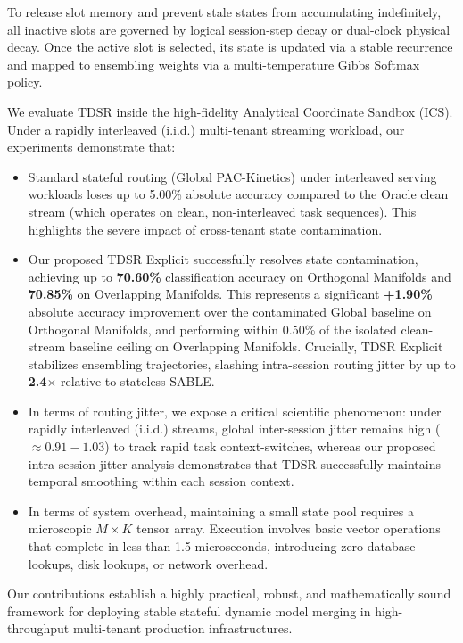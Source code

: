 To release slot memory and prevent stale states from accumulating indefinitely, all inactive slots are governed by logical session-step decay or dual-clock physical decay. Once the active slot is selected, its state is updated via a stable recurrence and mapped to ensembling weights via a multi-temperature Gibbs Softmax policy.

We evaluate TDSR inside the high-fidelity Analytical Coordinate Sandbox (ICS). Under a rapidly interleaved (i.i.d.) multi-tenant streaming workload, our experiments demonstrate that:
\begin{itemize}
    \item Standard stateful routing (Global PAC-Kinetics) under interleaved serving workloads loses up to 5.00\% absolute accuracy compared to the Oracle clean stream (which operates on clean, non-interleaved task sequences). This highlights the severe impact of cross-tenant state contamination.
    \item Our proposed TDSR Explicit successfully resolves state contamination, achieving up to \textbf{70.60\%} classification accuracy on Orthogonal Manifolds and \textbf{70.85\%} on Overlapping Manifolds. This represents a significant \textbf{+1.90\%} absolute accuracy improvement over the contaminated Global baseline on Orthogonal Manifolds, and performing within 0.50\% of the isolated clean-stream baseline ceiling on Overlapping Manifolds. Crucially, TDSR Explicit stabilizes ensembling trajectories, slashing intra-session routing jitter by up to \textbf{2.4$\times$} relative to stateless SABLE.
    \item In terms of routing jitter, we expose a critical scientific phenomenon: under rapidly interleaved (i.i.d.) streams, global inter-session jitter remains high ($\approx 0.91 - 1.03$) to track rapid task context-switches, whereas our proposed intra-session jitter analysis demonstrates that TDSR successfully maintains temporal smoothing within each session context.
    \item In terms of system overhead, maintaining a small state pool requires a microscopic $M \times K$ tensor array. Execution involves basic vector operations that complete in less than 1.5 microseconds, introducing zero database lookups, disk lookups, or network overhead.
\end{itemize}

Our contributions establish a highly practical, robust, and mathematically sound framework for deploying stable stateful dynamic model merging in high-throughput multi-tenant production infrastructures.
